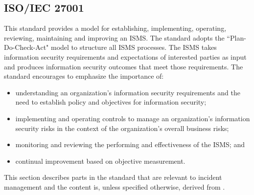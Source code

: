 \subsection{\acs{ISO}/\acs{IEC} 27001}
This standard provides a model for establishing, implementing, operating, reviewing, maintaining and improving an \ac{ISMS}. The standard adopts the ``Plan-Do-Check-Act" model to structure all \ac{ISMS} processes. The \ac{ISMS} takes information security requirements and expectations of interested parties as input and produces information security outcomes that meet those requirements. The standard encourages to emphasize the importance of:
\begin{itemize}\itemsep-0.2cm
\item understanding an organization's information security requirements and the need to establish policy and objectives for information security;
\item implementing and operating controls to manage an organization's information security risks in the context of the organization's overall business risks;
\item monitoring and reviewing the performing and effectiveness of the \ac{ISMS}; and
\item continual improvement based on objective measurement.
\end{itemize}

This section describes parts in the standard that are relevant to incident management and the content is, unless specified otherwise, derived from \cite{ISO/IEC27001}.